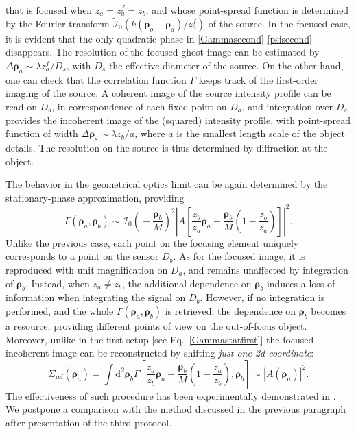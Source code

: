 \documentclass[aps,pra,amssymb,twocolumn,amsmath,superscriptaddress,showpacs,10pt]{revtex4-1}
\def\d{\mathrm{d}}
\begin{document}
that is focused when $z_a=z_a^f=z_b$, and whose point-spread function is determined by the Fourier transform $\tilde{\mathcal{I}}_0(k(\bm{\rho}_o-\bm{\rho}_a)/z_a^f)$ of the source. In the focused case, it is evident that the only quadratic phase in \eqref{Gammasecond}-\eqref{psisecond} disappears. The resolution of the focused ghost image can be estimated by $\Delta \bm{\rho}_a \sim \lambda z_a^f/D_s$, with $D_s$ the effective diameter of the source. On the other hand, one can check that the correlation function $\Gamma$ keeps track of the first-order imaging of the source. A coherent image of the source intensity profile can be read on $D_b$, in correspondence of each fixed point on $D_a$, and integration over $D_a$ provides the incoherent image of the (squared) intensity profile, with point-spread function of width $\Delta \bm{\rho}_s \sim \lambda z_b/a$, where $a$ is the smallest length scale of the object details. The resolution on the source is thus determined by diffraction at the object. 


The behavior in the geometrical optics limit can be again determined by the stationary-phase approximation, providing
\begin{equation}
\Gamma(\bm{\rho}_a,\bm{\rho}_b) \sim \mathcal{I}_0 \!\left(\! -\frac{\bm{\rho}_b}{M} \!\right)^2\! \left| A \!\left[ \frac{z_b}{z_a}\bm{\rho}_a - \frac{\bm{\rho}_b}{M} \!\left(1-\frac{z_b}{z_a}\right)\!\right]\! \right|^2 .
\end{equation}
Unlike the previous case, each point on the focusing element uniquely corresponds to a point on the sensor $D_b$. As for the focused image, it is reproduced with unit magnification on $D_a$, and remains unaffected by integration of $\bm{\rho}_b$. Instead, when $z_a\neq z_b$, the additional dependence on $\bm{\rho}_b$ induces a loss of information when integrating the signal on $D_b$. However, if no integration is performed, and the whole $\Gamma(\bm{\rho}_a,\bm{\rho}_b)$ is retrieved, the dependence on $\bm{\rho}_b$ becomes a resource, providing different points of view on the out-of-focus object.
Moreover, unlike in the first setup [see Eq.~\eqref{Gammastatfirst}] the focused incoherent image can be reconstructed by shifting \textit{just one 2d coordinate}:
\begin{equation}
\Sigma_{\mathrm{ref}}(\bm{\rho}_a)\! = \!\int\d^2\!\bm{\rho}_b \Gamma\!\left[\! \frac{z_a}{z_b}\bm{\rho}_a - \frac{\bm{\rho}_b}{M} \!\left(1-\frac{z_a}{z_b}\right), \bm{\rho}_b \!\right] \sim |A(\bm{\rho}_a)|^2 .
\end{equation} 
The effectiveness of such procedure has been experimentally demonstrated in \cite{cpi_exp}. We postpone a comparison with the method discussed in the previous paragraph after presentation of the third protocol.
\end{document}

